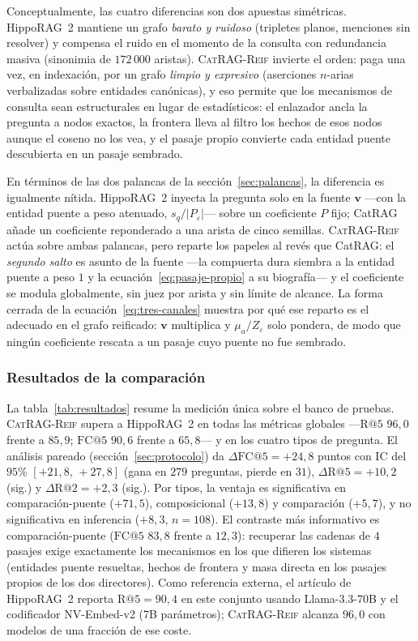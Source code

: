 \documentclass[11pt,a4paper]{article}
\newcommand{\sys}{\textsc{CatRAG-Reif}}          %
\newcommand{\hippo}{HippoRAG~2}
\begin{document}
Conceptualmente, las cuatro diferencias son dos apuestas simétricas.
\hippo{} mantiene un grafo \emph{barato y ruidoso} (tripletes planos,
menciones sin resolver) y compensa el ruido en el momento de la consulta con
redundancia masiva (sinonimia de $172\,000$ aristas). \sys{} invierte el
orden: paga una vez, en indexación, por un grafo \emph{limpio y expresivo}
(aserciones $n$-arias verbalizadas sobre entidades canónicas), y eso permite
que los mecanismos de consulta sean estructurales en lugar de estadísticos:
el enlazador ancla la pregunta a nodos exactos, la frontera lleva al filtro
los hechos de esos nodos aunque el coseno no los vea, y el pasaje propio
convierte cada entidad puente descubierta en un pasaje sembrado.

En términos de las dos palancas de la sección~\ref{sec:palancas}, la
diferencia es igualmente nítida. \hippo{} inyecta la pregunta solo en la
fuente $\mathbf{v}$ ---con la entidad puente a peso atenuado,
$s_q/|P_\varepsilon|$--- sobre un coeficiente $P$ fijo; CatRAG añade un
coeficiente reponderado a una arista de cinco semillas. \sys{} actúa
sobre ambas palancas, pero reparte los papeles al revés que CatRAG: el
\emph{segundo salto} es asunto de la fuente ---la compuerta dura siembra a
la entidad puente a peso $1$ y la ecuación~\ref{eq:pasaje-propio} a su
biografía--- y el coeficiente se modula globalmente, sin juez por arista y
sin límite de alcance. La forma cerrada de la
ecuación~\eqref{eq:tres-canales} muestra por qué ese reparto es el
adecuado en el grafo reificado: $\mathbf{v}$ multiplica y
$\mu_a/Z_\varepsilon$ solo pondera, de modo que ningún coeficiente rescata
a un pasaje cuyo puente no fue sembrado.

\subsubsection{Resultados de la comparación}

La tabla~\ref{tab:resultados} resume la medición única sobre el banco de
pruebas. \sys{} supera a \hippo{} en todas las métricas globales
---$\mathrm{R@}5$ $96{,}0$ frente a $85{,}9$; $\mathrm{FC@}5$ $90{,}6$ frente
a $65{,}8$--- y en los cuatro tipos de pregunta. El análisis pareado
(sección~\ref{sec:protocolo}) da $\Delta\mathrm{FC@}5 = +24{,}8$ puntos con
IC del $95\%$ $[+21{,}8,\,+27{,}8]$ (gana en $279$ preguntas, pierde en
$31$), $\Delta\mathrm{R@}5 = +10{,}2$ (sig.) y
$\Delta\mathrm{R@}2 = +2{,}3$ (sig.). Por tipos, la ventaja es
significativa en comparación-puente ($+71{,}5$), composicional ($+13{,}8$)
y comparación ($+5{,}7$), y no significativa en inferencia
($+8{,}3$, $n=108$). El contraste más informativo es
comparación-puente ($\mathrm{FC@}5$ $83{,}8$ frente a $12{,}3$): recuperar
las cadenas de $4$ pasajes exige exactamente los mecanismos en los que
difieren los sistemas (entidades puente resueltas, hechos de frontera y
masa directa en los pasajes propios de los dos directores). Como referencia
externa, el artículo de \hippo{} reporta $\mathrm{R@}5=90{,}4$ en este
conjunto usando Llama-3.3-70B y el codificador NV-Embed-v2 (7B parámetros);
\sys{} alcanza $96{,}0$ con modelos de una fracción de ese coste.
\end{document}
